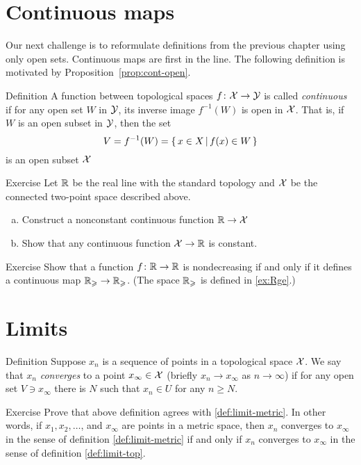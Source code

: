 \section{Continuous maps}

Our next challenge is to reformulate definitions from the previous chapter using only open sets.
Continuous maps are first in the line.
The following definition is motivated by Proposition~\ref{prop:cont-open}.

\begin{thm}{Definition}\label{def:cont-top}
A function between topological spaces 
$f\colon\mathcal{X}\to\mathcal{Y}$ is called \emph{continuous} if for any open set $W$ in $\mathcal{Y}$, its inverse image $f^{-1}(W)$ is open in $\mathcal{X}$.
That is, if $W$ is an open subset in $\mathcal{Y}$, then the set
\[V=f^{-1}(W)=\left\{\,{x\in X}\,\middle|\,{f(x)\in W}\,\right\}\]
is an open subset $\mathcal{X}$
\end{thm}

\begin{thm}{Exercise}
Let $\mathbb{R}$ be the real line with the standard topology
and $\mathcal{X}$ be the connected two-point space described above.
\begin{enumerate}[(a)]
\item Construct a nonconstant continuous function $\mathbb{R}\to \mathcal{X}$
\item Show that any continuous function $\mathcal{X}\to \mathbb{R}$ is constant.
\end{enumerate}

\end{thm}

\begin{thm}{Exercise} 
Show that a function $f\colon\mathbb{R}\to\mathbb{R}$ is nondecreasing if and only if it defines a continuous map $\mathbb{R}_\geqslant\to \mathbb{R}_\geqslant$.
(The space $\mathbb{R}_\geqslant$ is defined in \ref{ex:Rge}.)
\end{thm}

\section{Limits}

\begin{thm}{Definition}\label{def:limit-top}
Suppose $x_n$ is a sequence of points in a topological space $\mathcal{X}$.
We say that $x_n$ \emph{converges} to a point $x_\infty\in \mathcal{X}$ (briefly $x_n\to x_\infty$ as $n\to\infty$) if for any open set $V\ni x_\infty$ there is $N$ such that 
$x_n\in U$ for any $n\ge N$.
\end{thm}

\begin{thm}{Exercise}
Prove that above definition agrees with \ref{def:limit-metric}.
In other words, if $x_1,x_2,\dots$, and $x_\infty$ are points in a metric space, then $x_n$ converges to $x_\infty$ in the sense of definition \ref{def:limit-metric} if and only if $x_n$ converges to $x_\infty$ in the sense of definition \ref{def:limit-top}.
\end{thm}

